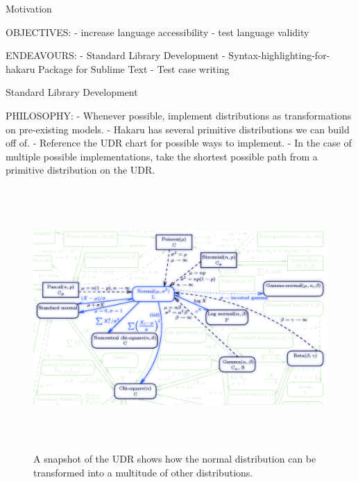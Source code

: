 \documentclass[22pt]{beamer}
\begin{document}
\begin{frame}[fragile]
\begin{textblock}{5}
\begin{textblock}{5}
\begin{block}{Motivation}
\justifying


\tiny{OBJECTIVES:
        - increase language accessibility
        - test language validity}

\bigskip

\tiny{ENDEAVOURS:
        - Standard Library Development
        - Syntax-highlighting-for-hakaru Package for Sublime Text
        - Test case writing}

\bigskip


\end{block}


\begin{block}{Standard Library Development}
\justifying

\tiny{ PHILOSOPHY:
        - Whenever possible, implement distributions as transformations on pre-existing models.
        - Hakaru has several primitive distributions we can build off of.
        - Reference the UDR chart for possible ways to implement.
        - In the case of multiple possible implementations, take the shortest possible path from a primitive distribution on the UDR.}

\bigskip

\begin{figure}
\centering
\includegraphics[height=10cm]{UDR.png}
\caption{\tiny{A snapshot of the UDR shows how the normal distribution can be transformed into a multitude of other distributions.}}
\end{figure}


\end{block}
\end{textblock}
\end{textblock}
\end{frame}
\end{document}
